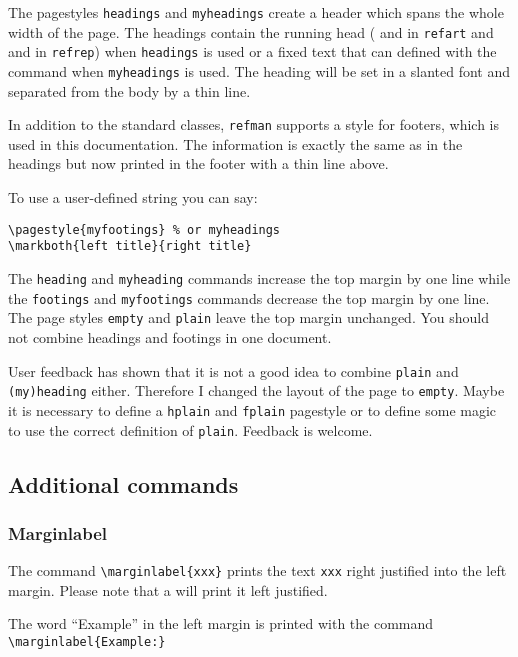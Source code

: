   The pagestyles \texttt{headings} and
\texttt{myheadings} create a header which spans the whole width of the page.
The headings contain the running head ( and  in
\texttt{refart} and  and  in \texttt{refrep}) when
\texttt{headings} is used or a fixed text that can defined  with the
 command when \texttt{myheadings} is used. The heading will be
set in a slanted font and separated from the body by a thin line.

In addition to the standard classes, \texttt{refman} supports a style 
for footers, which is used in this documentation. The information is 
exactly the same as in the headings but now printed in the footer with 
a thin line above.

To use a user-defined string you can say:
\begin{verbatim}
\pagestyle{myfootings} % or myheadings
\markboth{left title}{right title}
\end{verbatim}

The \texttt{heading} and \texttt{myheading} commands increase the top margin
by one line while the \texttt{footings} and \texttt{myfootings} commands
decrease the top margin by one line.  The page styles \texttt{empty} and
\texttt{plain} leave the top margin unchanged. You should not combine
headings and footings in one document.

User feedback has shown that it is not a good idea to combine \texttt{plain}
and \texttt{(my)heading} either. Therefore I changed the layout of the
 page to \texttt{empty}. Maybe it is necessary to define a
\texttt{hplain} and \texttt{fplain} pagestyle or to define some magic to use
the correct definition of \texttt{plain}. Feedback is welcome.

\subsection{Additional commands}

\subsubsection{Marginlabel}

The command \verb|\marginlabel{xxx}| prints the text \texttt{xxx} right
justified into the left margin. Please note that a  will print
it left justified.

 The word ``Example'' in the left margin is 
printed with the command \verb|\marginlabel{Example:}|

